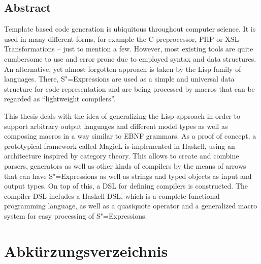 \documentclass[12pt, a4paper, bibgerm]{scrbook}
\newcommand{\sexps}{S"=Expressions}
\begin{document}
\section*{\centering Abstract}

Template based code generation is ubiquitous throughout computer
science.  It is used in many different forms, for example the C
preprocessor, PHP or XSL Transformations -- just to mention a
few. However, most existing tools are quite cumbersome to use and error
prone due to employed syntax and data structures. An alternative, yet
almost forgotten approach is taken by the Lisp family of languages. There,
\sexps{} are used as a simple and universal data structure for code
representation and are being processed by macros that can be regarded as
``lightweight compilers''.

This thesis deals with the idea of generalizing the Lisp approach in
order to support arbitrary output languages and different model types as
well as composing macros in a way similar to EBNF grammars. As a proof
of concept, a prototypical framework called MagicL is implemented in
Haskell, using an architecture inspired by category theory. This allows
to create and combine parsers, generators as well as other kinds of
compilers by the means of arrows that can have \sexps{} as well as
strings and typed objects as input and output types.  On top of this, a
DSL for defining compilers is constructed. The compiler DSL includes a
Haskell DSL, which is a complete functional programming language, as
well as a quasiquote operator and a generalized macro system for easy
processing of \sexps.

\cleardoublepage
\setcounter{tocdepth}{1}

\tableofcontents

\chapter*{Abkürzungsverzeichnis}
\begin{acronym}
\end{acronym}
\end{document}
